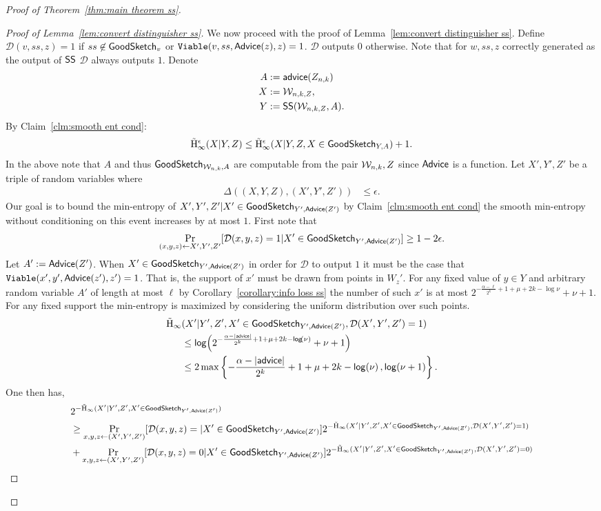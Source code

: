 \begin{proof}[Proof of Theorem~\ref{thm:main theorem ss}]
\begin{proof}[Proof of Lemma~\ref{lem:convert distinguisher ss}]
We now proceed with the proof of Lemma~\ref{lem:convert distinguisher ss}. Define $\mathcal{D}(v, ss, z) =1$ if $ss\not\in\mathsf{GoodSketch}_v$ or $\mathtt{Viable}(v, ss, {\mathsf{Advice}}(z), z) =1$.  $\mathcal{D}$ outputs $0$ otherwise.  Note that for $w, ss, z$ correctly generated as the output of ${\mathsf{SS}}$ $\mathcal{D}$ always outputs $1$. Denote 
\begin{align*}
A&:= {\mathsf{advice}}(Z_{n,k})\\
X&:=\mathcal{W}_{n,k, Z},\\
Y&:={\mathsf{SS}}(\mathcal{W}_{n,k, Z}, A).
\end{align*}
 By Claim~\ref{clm:smooth ent cond}:
\[
\tilde{\mathrm{H}}_\infty^\epsilon(X| Y, Z) \le \tilde{\mathrm{H}}_\infty^\epsilon(X| Y,Z, X \in \mathsf{GoodSketch}_{Y, A}) +1.
\]
In the above note that $A$ and thus $\mathsf{GoodSketch}_{\mathcal{W}_{n,k}, A}$ are computable from the pair $\mathcal{W}_{n,k}, Z$ since ${\mathsf{Advice}}$ is a function. 
Let $X', Y', Z'$ be a triple of random variables where 
\begin{align*}
\Delta((X, Y, Z), (X', Y', Z')) &\le \epsilon.
\end{align*} Our goal is to bound the min-entropy of $X', Y', Z' | X'\in\mathsf{GoodSketch}_{Y', {\mathsf{Advice}}(Z')}$ by Claim~\ref{clm:smooth ent cond} the smooth min-entropy without conditioning on this event increases by at most $1$.
First note that \[\Pr_{(x, y, z) \leftarrow X', Y', Z' }[\mathcal{D}(x,y,z)=1| X'\in\mathsf{GoodSketch}_{Y', {\mathsf{Advice}}(Z')}]\ge 1-2\epsilon.\]
Let $A':= {\mathsf{Advice}}(Z')$.  When $X'\in\mathsf{GoodSketch}_{Y', {\mathsf{Advice}}(Z')}$ in order for $\mathcal{D}$ to output $1$ it must be the case that $\mathtt{Viable}(x', y', {\mathsf{Advice}}(z'), z') =1$. That is, the support of $x'$ must be drawn from points in $W_z'$.  For any fixed value of $y\in Y$ and arbitrary random variable $A'$ of length at most $\ell$ by Corollary~\ref{corollary:info loss ss} the number of such $x'$ is at most $2^{-\frac{\alpha-\ell}{2^k}+1+\mu+2k-\log{\nu}}+\nu+1.$ For any fixed support the min-entropy is maximized by considering the uniform distribution over such points. \begin{align*}
\tilde{\mathrm{H}}_\infty&(X'|Y' ,Z', X'\in\mathsf{GoodSketch}_{Y', {\mathsf{Advice}}(Z')}, \mathcal{D}(X', Y', Z')=1)\\ &\le \mathsf{log}\!\left(2^{-\frac{\alpha-|{\mathsf{advice}}|}{2^k}+1+\mu+2k-\mathsf{log}\!\left(\nu\right)}+\nu+1\right)\\
&\le 2\max\left\{-\frac{\alpha-|{\mathsf{advice}}|}{2^k}+1+\mu+2k-\mathsf{log}\!\left(\nu\right), \mathsf{log}\!\left(\nu+1\right)\right\}.
\end{align*}
One then has, 
\begin{align*}
&2^{-\Hav(X'|Y', Z',X'\in\goodsketch_{Y', \aux(Z')})} \\&\ge \Pr_{x, y, z\leftarrow (X', Y', Z')} [\mathcal{D}(x, y, z)= | X'\in\goodsketch_{Y', \aux(Z')}] 2^{-\Hav(X'|Y', Z', X'\in\goodsketch_{Y', \aux(Z')}, \mathcal{D}(X', Y', Z')=1) }\\&+ \Pr_{x, y, z\leftarrow (X', Y', Z') } [\mathcal{D}(x, y, z)=0| X'\in\goodsketch_{Y', \aux(Z')}] 2^{-\Hav(X'|Y', Z', X'\in\goodsketch_{Y', \aux(Z')}, \mathcal{D}(X', Y', Z')=0) }\\

\end{align*}
\end{proof}
\end{proof}
